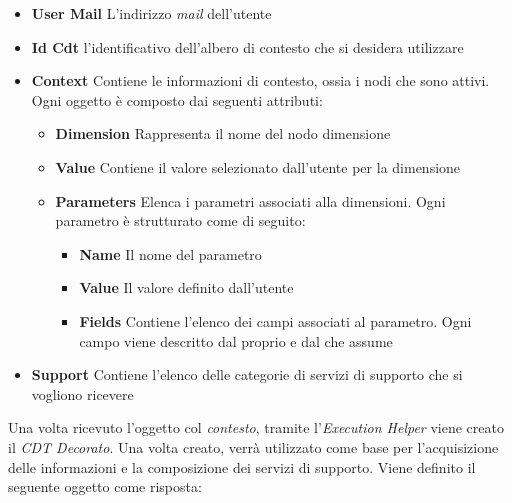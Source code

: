 \begin{itemize}
	\item \textbf{User Mail}
	L'indirizzo \emph{mail} dell'utente
	\item \textbf{Id Cdt}
	\upe l'identificativo dell'albero di contesto che si desidera utilizzare
	\item \textbf{Context}
	Contiene le informazioni di contesto, ossia i nodi che sono attivi. Ogni oggetto è composto dai seguenti attributi:
	\begin{itemize}
		\item \textbf{Dimension}
		Rappresenta il nome del nodo dimensione
		\item \textbf{Value}
		Contiene il valore selezionato dall'utente per la dimensione
		\item \textbf{Parameters}
		Elenca i parametri associati alla dimensioni. Ogni parametro è strutturato come di seguito:
		\begin{itemize}
			\item \textbf{Name}
			Il nome del parametro
			\item \textbf{Value}
			Il valore definito dall'utente
			\item \textbf{Fields}
			Contiene l'elenco dei campi associati al parametro. Ogni campo viene descritto dal proprio  e dal  che assume
		\end{itemize}
	\end{itemize}
	\item \textbf{Support}
	Contiene l'elenco delle categorie di servizi di supporto che si vogliono ricevere
\end{itemize}

Una volta ricevuto l'oggetto col \emph{contesto}, tramite l'\emph{Execution Helper} viene creato il \emph{CDT Decorato}. Una volta creato, verrà utilizzato come base per l'acquisizione delle informazioni e la composizione dei servizi di supporto. Viene definito il seguente oggetto come risposta:

